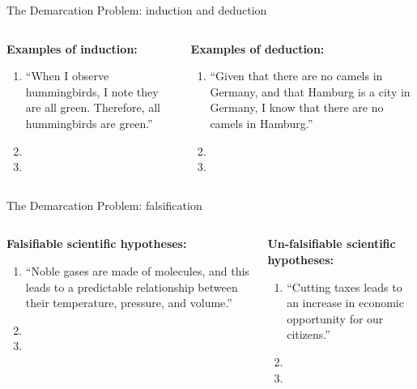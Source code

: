 \documentclass{beamer}
\begin{document}
\begin{frame}{The Demarcation Problem: induction and deduction}
\small
\begin{columns}[T]
\begin{column}{0.45\textwidth}
\textbf{Examples of induction:}
\begin{enumerate}
\item ``When I observe hummingbirds, I note they are all green.  Therefore, all hummingbirds are green.''
\item \vspace{0.5cm}
\item \vspace{0.5cm}
\end{enumerate}
\end{column}
\begin{column}{0.45\textwidth}
\textbf{Examples of deduction:}
\begin{enumerate}
\item ``Given that there are no camels in Germany, and that Hamburg is a city in Germany, I know that there are no camels in Hamburg.''
\item \vspace{0.5cm}
\item \vspace{0.5cm}
\end{enumerate}
\end{column}
\end{columns}
\end{frame}

\begin{frame}{The Demarcation Problem: falsification}
\small
\begin{columns}[T]
\begin{column}{0.45\textwidth}
\textbf{Falsifiable scientific hypotheses:}
\begin{enumerate}
\item ``Noble gases are made of molecules, and this leads to a predictable relationship between their temperature, pressure, and volume.''
\item \vspace{0.5cm}
\item \vspace{0.5cm}
\end{enumerate}
\end{column}
\begin{column}{0.45\textwidth}
\textbf{Un-falsifiable scientific hypotheses:}
\begin{enumerate}
\item ``Cutting taxes leads to an increase in economic opportunity for our citizens.''
\item \vspace{0.5cm}
\item \vspace{0.5cm}
\end{enumerate}
\end{column}
\end{columns}
\end{frame}
\end{document}

